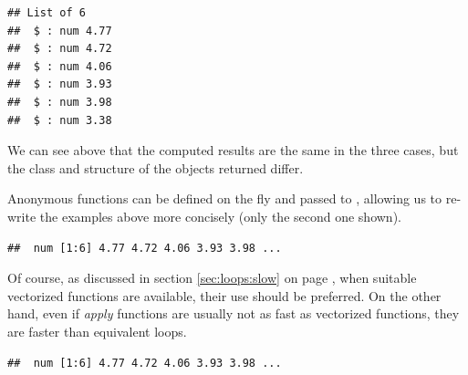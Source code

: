 \documentclass[krantz2]{krantz}\usepackage{knitr}%
\begin{document}
\begin{knitrout}\footnotesize
{}\color{fgcolor}\begin{kframe}
\begin{alltt}
 \hlkwb{<-} \hlstd{(}     \hlstd{=} \hlstd{,}  \hlstd{=} \hlstd{)}
\end{alltt}
\begin{verbatim}
## List of 6
##  $ : num 4.77
##  $ : num 4.72
##  $ : num 4.06
##  $ : num 3.93
##  $ : num 3.98
##  $ : num 3.38
\end{verbatim}
\end{kframe}
\end{knitrout}

We can see above that the computed results are the same in the three cases, but the class and structure of the objects returned differ.

Anonymous functions can be defined on the fly and passed to , allowing us to re-write the examples above more concisely (only the second one shown).

\begin{knitrout}\footnotesize
{}\color{fgcolor}\begin{kframe}
\begin{alltt}
 \hlkwb{<-} \hlstd{(}   \hlstd{=} \hlstd{(}\hlstd{,} \hlstd{) \{} \hlopt{+}   \hlstd{=} \hlstd{)}
\end{alltt}
\begin{verbatim}
##  num [1:6] 4.77 4.72 4.06 3.93 3.98 ...
\end{verbatim}
\end{kframe}
\end{knitrout}

Of course, as discussed in section \ref{sec:loops:slow} on page \pageref{sec:loops:slow}, when suitable vectorized functions are available, their use should be preferred. On the other hand, even if \emph{apply} functions are usually not as fast as vectorized functions, they are faster than equivalent  loops.

\begin{knitrout}\footnotesize
{}\color{fgcolor}\begin{kframe}
\begin{alltt}
 \hlkwb{<-}  \hlopt{+} 
\end{alltt}
\begin{verbatim}
##  num [1:6] 4.77 4.72 4.06 3.93 3.98 ...
\end{verbatim}
\end{kframe}
\end{knitrout}
\end{document}
